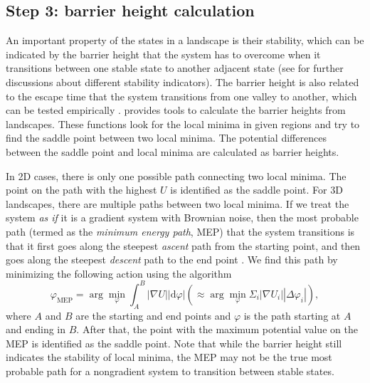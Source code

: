 \subsection{Step 3: barrier height calculation}\label{sec:singlel}

An important property of the states in a landscape is their stability, which can be indicated by the barrier height that the system has to overcome when it transitions between one stable state to another adjacent state (see \citet{CuiEtAlMetaphorComputationConstructing2021} for further discussions about different stability indicators). The barrier height is also related to the escape time that the system transitions from one valley to another, which can be tested empirically \citep{wangPotentialLandscapeFlux2008}.  provides tools to calculate the barrier heights from landscapes. These functions look for the local minima in given regions and try to find the saddle point between two local minima. The potential differences between the saddle point and local minima are calculated as barrier heights.

In 2D cases, there is only one possible path connecting two local minima. The point on the path with the highest \(U\) is identified as the saddle point. For 3D landscapes, there are multiple paths between two local minima. If we treat the system \emph{as if} it is a gradient system with Brownian noise, then the most probable path (termed as the \emph{minimum energy path}, MEP) that the system transitions is that it first goes along the steepest \emph{ascent} path from the starting point, and then goes along the steepest \emph{descent} path to the end point \citep{EVanden-EijndenTransitionpathTheoryPathfinding2010}. We find this path by minimizing the following action using the \citet{dijkstra1959note} algorithm \citep{HeymannVanden-EijndenPathwaysMaximumLikelihood2008}
\begin{equation}
\varphi_{\mathrm{MEP}} = \arg\min_\varphi \int_A^B |\nabla U||\mathrm{d}\varphi|\left( \approx \arg \min_\varphi \Sigma_i |\nabla U_i||\Delta \varphi_i|\right),
\label{eq:optim}
\end{equation}
where \(A\) and \(B\) are the starting and end points and \(\varphi\) is the path starting at \(A\) and ending in \(B\). After that, the point with the maximum potential value on the MEP is identified as the saddle point. Note that while the barrier height still indicates the stability of local minima, the MEP may not be the true most probable path for a nongradient system to transition between stable states.

